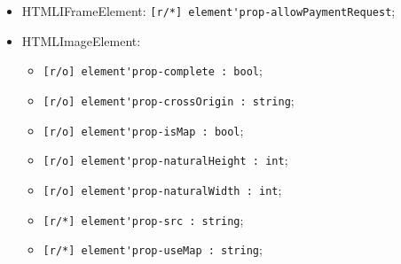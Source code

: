 \documentclass[a4paper, 14pt]{extarticle}
\newenvironment{icItems}
	{ \begin{itemize} [noitemsep,nolistsep] }
	{ \end{itemize} }
\begin{document}
\begin{icItems}
	\item HTMLIFrameElement: \lstinline|[r/*] element'prop-allowPaymentRequest|;
	
	\item HTMLImageElement:
	\begin{icItems}
		\item \lstinline|[r/o] element'prop-complete : bool|;
		\item \lstinline|[r/o] element'prop-crossOrigin : string|;
		\item \lstinline|[r/o] element'prop-isMap : bool|;
		\item \lstinline|[r/o] element'prop-naturalHeight : int|;
		\item \lstinline|[r/o] element'prop-naturalWidth : int|;
		\item \lstinline|[r/*] element'prop-src : string|;
		\item \lstinline|[r/*] element'prop-useMap : string|;
	\end{icItems}
	

\end{icItems}
\end{document}
